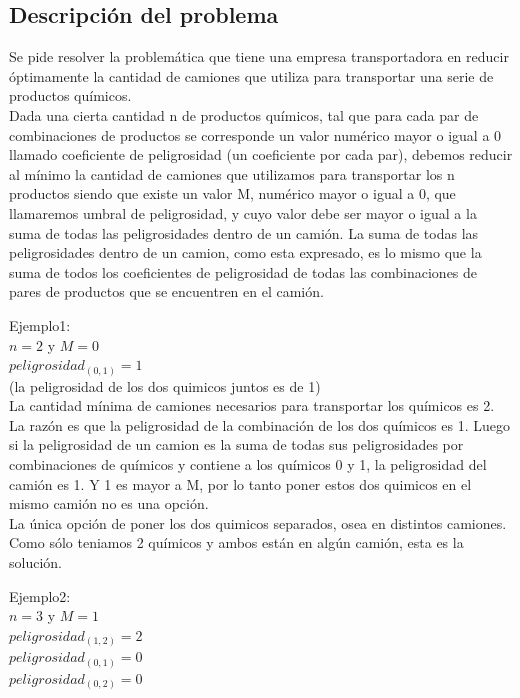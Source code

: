 \subsection{Descripci\'on del problema}

\noindent
Se pide resolver la problem\'atica que tiene una empresa transportadora en reducir \'optimamente la cantidad de camiones que utiliza para transportar una serie de productos qu\'imicos. \\
Dada una cierta cantidad n de productos qu\'imicos, tal que para cada par de combinaciones de productos se corresponde un valor num\'erico mayor o igual a 0 llamado coeficiente de peligrosidad (un coeficiente por cada par), debemos reducir al m\'inimo la cantidad de camiones que utilizamos para transportar los n productos siendo que existe un valor M, num\'erico mayor o igual a 0, que llamaremos umbral de peligrosidad, y cuyo valor debe ser mayor o igual a la suma de todas las peligrosidades dentro de un cami\'on. La suma de todas las peligrosidades dentro de un camion, como esta expresado, es lo mismo que la suma de todos los coeficientes de peligrosidad de todas las combinaciones de pares de productos que se encuentren en el cami\'on. 
\bigskip

\noindent
Ejemplo1: \\
$n = 2$ y $M = 0$ \\ 
$peligrosidad_{(0,1)} = 1$ \\
(la peligrosidad de los dos quimicos juntos es de 1) \\

\noindent
La cantidad m\'inima de camiones necesarios para transportar los qu\'imicos es 2. La raz\'on es que la peligrosidad de la combinaci\'on de los dos qu\'imicos es 1. Luego si la peligrosidad de un camion es la suma de todas sus peligrosidades por combinaciones de qu\'imicos y contiene a los qu\'imicos 0 y 1, la peligrosidad del cami\'on es 1. Y 1 es mayor a M, por lo tanto poner estos dos quimicos en el mismo cami\'on no es una opci\'on. \\
La \'unica opci\'on de poner los dos quimicos separados, osea en distintos camiones. Como s\'olo teniamos 2 qu\'imicos y ambos est\'an en alg\'un cami\'on, esta es la soluci\'on. 
\bigskip
\bigskip

\noindent
Ejemplo2: \\
$n = 3$ y $M = 1$ \\
$peligrosidad_{(1,2)} = 2$ \\
$peligrosidad_{(0,1)} = 0$ \\
$peligrosidad_{(0,2)} = 0$ \\

